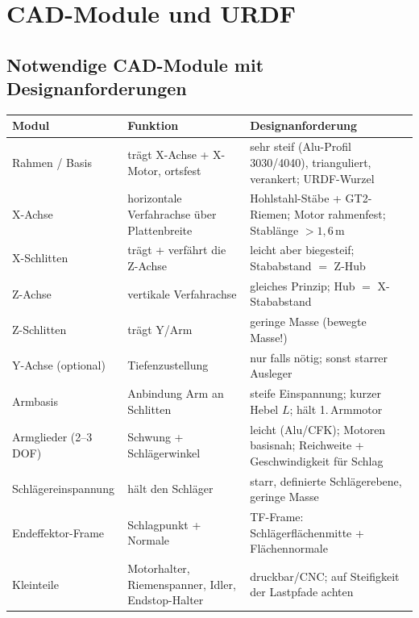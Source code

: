 
\chapter{CAD-Module und URDF}

\section{Notwendige CAD-Module mit Designanforderungen}
\begin{longtable}{@{}p{3.0cm}p{4.4cm}p{7.2cm}@{}}
\toprule
\textbf{Modul} & \textbf{Funktion} & \textbf{Designanforderung} \\
\midrule
Rahmen / Basis         & trägt X-Achse + X-Motor, ortsfest & sehr steif (Alu-Profil 3030/4040), trianguliert, verankert; URDF-Wurzel \\
X-Achse                & horizontale Verfahrachse über Plattenbreite & Hohlstahl-Stäbe + GT2-Riemen; Motor rahmenfest; Stablänge $>1{,}6\,$m \\
X-Schlitten            & trägt + verfährt die Z-Achse & leicht aber biegesteif; Stababstand $=$ Z-Hub \\
Z-Achse                & vertikale Verfahrachse & gleiches Prinzip; Hub $=$ X-Stababstand \\
Z-Schlitten            & trägt Y/Arm & geringe Masse (bewegte Masse!) \\
Y-Achse (optional)     & Tiefenzustellung & nur falls nötig; sonst starrer Ausleger \\
Armbasis               & Anbindung Arm an Schlitten & steife Einspannung; kurzer Hebel $L$; hält 1.\,Armmotor \\
Armglieder (2--3 DOF)  & Schwung + Schlägerwinkel & leicht (Alu/CFK); Motoren basisnah; Reichweite + Geschwindigkeit für Schlag \\
Schlägereinspannung    & hält den Schläger & starr, definierte Schlägerebene, geringe Masse \\
Endeffektor-Frame      & Schlagpunkt + Normale & TF-Frame: Schlägerflächenmitte + Flächennormale \\
Kleinteile             & Motorhalter, Riemenspanner, Idler, Endstop-Halter & druckbar/CNC; auf Steifigkeit der Lastpfade achten \\
\bottomrule
\end{longtable}

